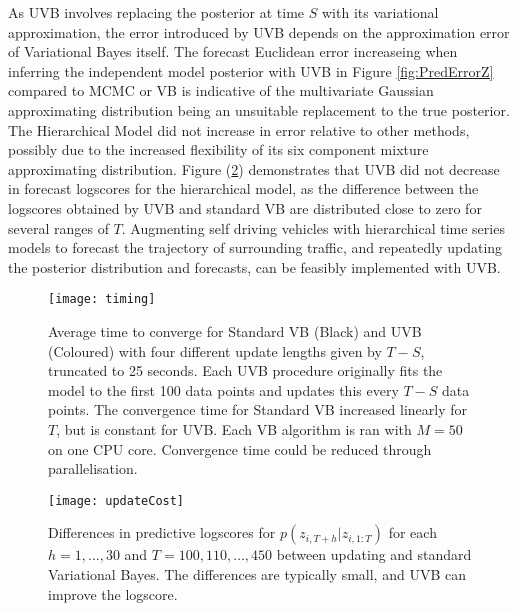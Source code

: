 \documentclass[12pt,a4paper]{article}\usepackage[]{graphicx}\usepackage[]{color}
\begin{document}
As UVB involves replacing the posterior at time $S$ with its variational approximation, the error introduced by UVB depends on the approximation error of Variational Bayes itself. The forecast Euclidean error increaseing when inferring the independent model posterior with UVB in Figure \ref{fig:PredErrorZ} compared to MCMC or VB is indicative of the multivariate Gaussian approximating distribution being an unsuitable replacement to the true posterior. The Hierarchical Model did not increase in error relative to other methods, possibly due to the increased flexibility of its six component mixture approximating distribution. Figure (\ref{fig:updateCost}) demonstrates that UVB did not decrease in forecast logscores for the hierarchical model, as the difference between the logscores obtained by UVB and standard VB are distributed close to zero for several ranges of $T$. Augmenting self driving vehicles with hierarchical time series models to forecast the trajectory of surrounding traffic, and repeatedly updating the posterior distribution and forecasts, can be feasibly implemented with UVB.
\begin{figure}[htp]
\centering
\texttt{[image: timing]}
\caption{Average time to converge for Standard VB (Black) and UVB (Coloured) with four different update lengths given by $T - S$, truncated to 25 seconds. Each UVB procedure originally fits the model to the first 100 data points and updates this every $T - S$ data points. The convergence time for Standard VB increased linearly for $T$, but is constant for UVB. Each VB algorithm is ran with $M = 50$ on one CPU core. Convergence time could be reduced through parallelisation.}
\label{fig:timing}
\end{figure}
\begin{figure}[htp]
\centering
\texttt{[image: updateCost]}
\caption{Differences in predictive logscores for $p(z_{i, T+h} | z_{i, 1:T})$ for each $h = 1, \dots, 30$ and $T = 100, 110, \dots, 450$ between updating and standard Variational Bayes. The differences are typically small, and UVB can improve the logscore.}
\label{fig:updateCost}
\end{figure}

\newpage
\end{document}
